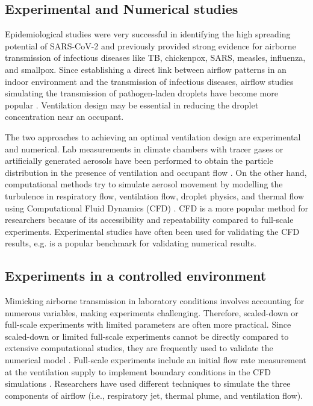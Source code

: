\documentclass[a4paper,12pt]{elsarticle}
\begin{document}
\subsection{Experimental and Numerical studies}

Epidemiological studies were very successful in identifying the high spreading potential of SARS-CoV-2 \cite{rothan2020epidemiology} and previously provided strong evidence for airborne transmission of infectious diseases like TB, chickenpox, SARS, measles, influenza, and smallpox. Since establishing a direct link between airflow patterns in an indoor environment and the transmission of infectious diseases, airflow studies simulating the transmission of pathogen-laden droplets have become more popular \cite{li2007role}. Ventilation design may be essential in reducing the droplet concentration near an occupant. 

The two approaches to achieving an optimal ventilation design are experimental and numerical. Lab measurements in climate chambers with tracer gases or artificially generated aerosols have been performed to obtain the particle distribution in the presence of ventilation and occupant flow \cite{zhou2021experimental}. On the other hand, computational methods try to simulate aerosol movement by modelling the turbulence in respiratory flow, ventilation flow, droplet physics, and thermal flow using Computational Fluid Dynamics (CFD) \cite{wang2022evaluation}. CFD is a more popular method for researchers because of its accessibility and repeatability compared to full-scale experiments. Experimental studies have often been used for validating the CFD results, e.g. \cite{yin2009experimental} is a popular benchmark for validating numerical results.

\subsection{Experiments in a controlled environment}

Mimicking airborne transmission in laboratory conditions involves accounting for numerous variables, making experiments challenging. Therefore, scaled-down \cite{poussou2010flow} or full-scale experiments with limited parameters \cite{luo2022role} are often more practical. Since scaled-down or limited full-scale experiments cannot be directly compared to extensive computational studies, they are frequently used to validate the numerical model \cite{li2020investigating,qin2023transmission,cortellessa2023effectiveness}. Full-scale experiments include an initial flow rate measurement at the ventilation supply to implement boundary conditions in the CFD simulations \cite{romano2015numerical}. Researchers have used different techniques to simulate the three components of airflow (i.e., respiratory jet, thermal plume, and ventilation flow).
\end{document}
